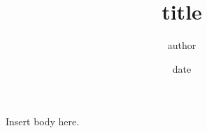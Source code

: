 \documentclass[10pt,letterpaper]{article}	%
\title{title}								%
\author{author}								%
\date{date}									%
\begin{document}
\maketitle
Insert body here. 							%
\end{document}
